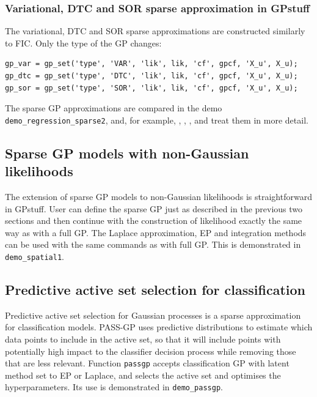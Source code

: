 \documentclass[twoside,11pt]{article}
\newcommand{\pkg}[1]{{\fontseries{b}\selectfont #1}}
\newcommand{\code}[1]{{\normalfont\texttt{#1}}}
\begin{document}
\subsubsection{Variational, DTC and SOR sparse approximation in GPstuff}


The variational, DTC and SOR sparse approximations are constructed
similarly to FIC. Only the type of the GP changes:
%
\begin{verbatim}
gp_var = gp_set('type', 'VAR', 'lik', lik, 'cf', gpcf, 'X_u', X_u);
gp_dtc = gp_set('type', 'DTC', 'lik', lik, 'cf', gpcf, 'X_u', X_u);
gp_sor = gp_set('type', 'SOR', 'lik', lik, 'cf', gpcf, 'X_u', X_u);
\end{verbatim}
%
The sparse GP approximations are compared in the demo
\code{demo\_regression\_sparse2}, and, for example,
\citet{Quinonero-Candela+Rasmussen:2005}, \citet{Snelson:2007b},
\citet{Titsias:2009}, and \citet{Alvarez+Luengo+Titsias+Lawrence:2010}
treat them in more detail.


\subsection{Sparse GP models with non-Gaussian likelihoods}

The extension of sparse GP models to non-Gaussian likelihoods is
straightforward in \pkg{GPstuff}. User can define the sparse GP just
as described in the previous two sections and then continue with the
construction of likelihood exactly the same way as with a full GP.
The Laplace approximation, EP and integration methods can be used with
the same commands as with full GP. This is demonstrated in
\code{demo\_spatial1}.

\subsection{Predictive active set selection for classification}

Predictive active set selection for Gaussian processes \citep[PASS-GP,
][]{Henao+Winther:2012} is a sparse approximation for classification
models. PASS-GP uses predictive distributions to estimate which data
points to include in the active set, so that it will include points
with potentially high impact to the classifier decision process while
removing those that are less relevant.
%
Function \code{passgp} accepts classification GP with latent method
set to EP or Laplace, and selects the active set and optimises the
hyperparameters. Its use is demonstrated in \code{demo\_passgp}.
\end{document}
